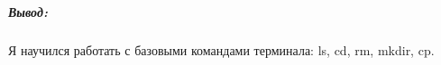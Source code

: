 




\subparagraph{Вывод:}
Я научился работать с базовыми командами терминала: ls, cd, rm, mkdir,
cp.
